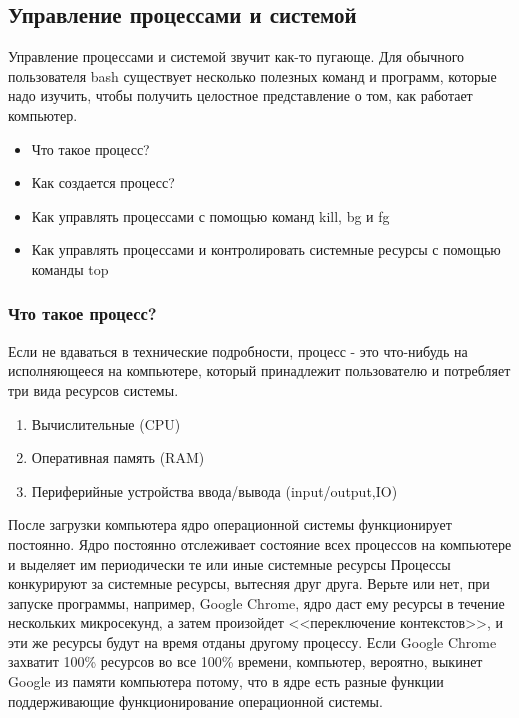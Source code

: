 \documentclass[12pt]{article}
\providecommand{\tightlist}{%
  \setlength{\itemsep}{0pt}\setlength{\parskip}{0pt}}
\begin{document}
\hypertarget{Process-Management-and-System-Management}{%
\subsection{\texorpdfstring{\protect\hyperlink{Process-Management-and-System-Management}{}Управление
процессами и
системой}{Управление процессами и системой}}\label{Process-Management-and-System-Management}}

Управление процессами и системой звучит как-то пугающе. Для обычного
пользователя bash существует несколько полезных команд и программ,
которые надо изучить, чтобы получить целостное представление о том, как
работает компьютер.

\begin{itemize}
\tightlist
\item
  Что такое процесс?
\item
  Как создается процесс?
\item
  Как управлять процессами с помощью команд kill, bg и fg
\item
  Как управлять процессами и контролировать системные ресурсы с помощью
  команды top
\end{itemize}

\hypertarget{What-is-a-Process}{%
\subsubsection{\texorpdfstring{\protect\hyperlink{What-is-a-Process}{}Что
такое процесс?}{Что такое процесс?}}\label{What-is-a-Process}}

Если не вдаваться в технические подробности, процесс - это что-нибудь на
исполняющееся на компьютере, который принадлежит пользователю и
потребляет три вида ресурсов системы.

\begin{enumerate}
\tightlist
\item
  Вычислительные (CPU)
\item
  Оперативная память (RAM)
\item
  Периферийные устройства ввода/вывода (input/output,IO)
\end{enumerate}

После загрузки компьютера ядро операционной системы функционирует
постоянно. Ядро постоянно отслеживает состояние всех процессов на
компьютере и выделяет им периодически те или иные системные ресурсы
Процессы конкурируют за системные ресурсы, вытесняя друг друга. Верьте
или нет, при запуске программы, например, Google Chrome, ядро даст ему
ресурсы в течение нескольких микросекунд, а затем произойдет
<<переключение контекстов>>, и эти же ресурсы будут на время отданы
другому процессу. Если Google Chrome захватит 100\% ресурсов во все
100\% времени, компьютер, вероятно, выкинет Google из памяти компьютера
потому, что в ядре есть разные функции поддерживающие функционирование
операционной системы.
\end{document}
